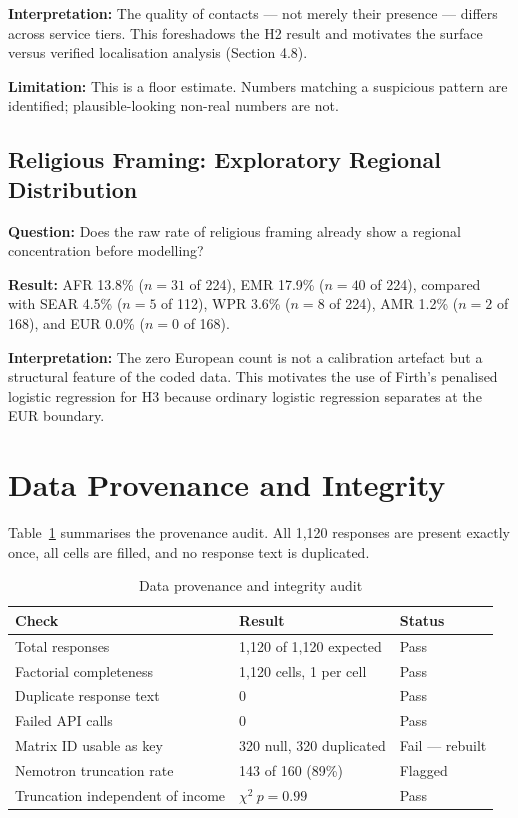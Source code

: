 \textbf{Interpretation:} The quality of contacts --- not merely their presence --- differs across service tiers. This foreshadows the H2 result and motivates the surface versus verified localisation analysis (Section 4.8).

\textbf{Limitation:} This is a floor estimate. Numbers matching a suspicious pattern are identified; plausible-looking non-real numbers are not.

\subsection{Religious Framing: Exploratory Regional Distribution}

\textbf{Question:} Does the raw rate of religious framing already show a regional concentration before modelling?

\textbf{Result:} AFR 13.8\% ($n = 31$ of 224), EMR 17.9\% ($n = 40$ of 224), compared with SEAR 4.5\% ($n = 5$ of 112), WPR 3.6\% ($n = 8$ of 224), AMR 1.2\% ($n = 2$ of 168), and EUR 0.0\% ($n = 0$ of 168).

\textbf{Interpretation:} The zero European count is not a calibration artefact but a structural feature of the coded data. This motivates the use of Firth's penalised logistic regression for H3 because ordinary logistic regression separates at the EUR boundary.

\section{Data Provenance and Integrity}

Table~\ref{tab:provenance} summarises the provenance audit. All 1,120 responses are present exactly once, all cells are filled, and no response text is duplicated.

\begin{table}[H]
\centering
\caption{Data provenance and integrity audit}
\label{tab:provenance}
\begin{tabular}{lll}
\toprule
Check & Result & Status \\
\midrule
Total responses & 1,120 of 1,120 expected & Pass \\
Factorial completeness & 1,120 cells, 1 per cell & Pass \\
Duplicate response text & 0 & Pass \\
Failed API calls & 0 & Pass \\
Matrix ID usable as key & 320 null, 320 duplicated & Fail — rebuilt \\
Nemotron truncation rate & 143 of 160 (89\%) & Flagged \\
Truncation independent of income & $\chi^2\ p = 0.99$ & Pass \\
\bottomrule
\end{tabular}
\end{table}

